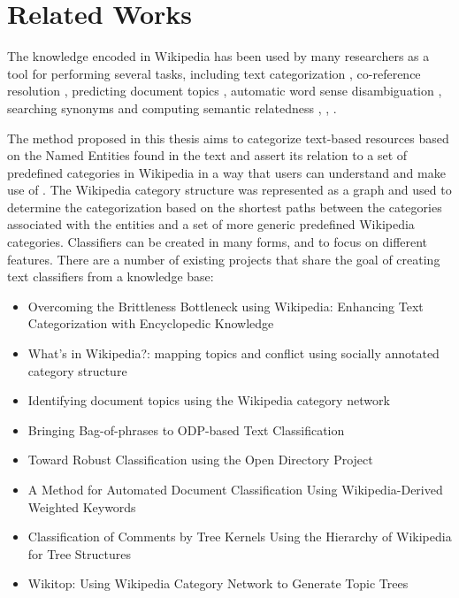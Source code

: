 \chapter{\hspace*{3pt} Related Works}
\label{chapter:related-works}


The knowledge encoded in Wikipedia has been used by many researchers as a tool for performing several tasks, including text categorization \cite{Gabrilovich:2006}, co-reference resolution \cite{strube2006wikirelate}, predicting document topics \cite{schonhofen2009identifying}, automatic word sense disambiguation \cite{mihalcea2007using}, searching synonyms \cite{krizhanovsky2006synonym} and computing semantic relatedness 
\cite{ponzetto2006exploiting}, \cite{gabrilovich2007computing}, \cite{milne2007computing}.


The method proposed in this thesis aims to categorize text-based resources based on the Named Entities found in the text and assert its relation to a set of predefined categories in Wikipedia in a way that users can understand and make use of%
. The Wikipedia category structure was represented as a graph and used to determine the categorization based on the shortest paths between the categories associated with the entities and a set of more generic predefined Wikipedia categories. Classifiers can be created in many forms, and to focus on different features. There are a number of existing projects that share the goal of creating text classifiers from a knowledge base:

\begin{itemize}


\item Overcoming the Brittleness Bottleneck using Wikipedia: Enhancing Text Categorization with Encyclopedic Knowledge \cite{Gabrilovich:2006}

\item What's in Wikipedia?: mapping topics and conflict using socially annotated category structure \cite{kittur2009s}

\item Identifying document topics using the Wikipedia category network \cite{schonhofen2009identifying}

\item Bringing Bag-of-phrases to ODP-based Text Classification \cite{7425975}

\item Toward Robust Classification using the Open Directory Project \cite{7058134}

\item A Method for Automated Document Classification
Using Wikipedia-Derived Weighted Keywords \cite{7062484}

\item Classification of Comments by Tree Kernels Using the Hierarchy of Wikipedia for Tree Structures \cite{takeda2016classification}

\item Wikitop: Using Wikipedia Category Network to Generate Topic Trees \cite{kumar2017wikitop}



\end{itemize}



